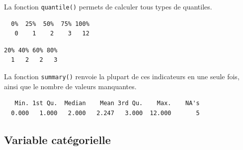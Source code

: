 \documentclass[
  letterpaper,
  DIV=11,
  numbers=noendperiod,
  oneside]{scrreprt}
\newenvironment{Shaded}{\begin{snugshade}}{\end{snugshade}}
\newcommand{\AttributeTok}[1]{\textcolor[rgb]{0.40,0.45,0.13}{#1}}
\newcommand{\ConstantTok}[1]{\textcolor[rgb]{0.56,0.35,0.01}{#1}}
\newcommand{\DecValTok}[1]{\textcolor[rgb]{0.68,0.00,0.00}{#1}}
\newcommand{\FunctionTok}[1]{\textcolor[rgb]{0.28,0.35,0.67}{#1}}
\newcommand{\NormalTok}[1]{\textcolor[rgb]{0.00,0.23,0.31}{#1}}
\newcommand{\SpecialCharTok}[1]{\textcolor[rgb]{0.37,0.37,0.37}{#1}}
\begin{document}
La fonction \texttt{quantile()} permets de calculer tous types de
quantiles.

\begin{Shaded}
\end{Shaded}

\begin{verbatim}
  0%  25%  50%  75% 100% 
   0    1    2    3   12 
\end{verbatim}

\begin{Shaded}
\end{Shaded}

\begin{verbatim}
20% 40% 60% 80% 
  1   2   2   3 
\end{verbatim}

La fonction \texttt{summary()} renvoie la plupart de ces indicateurs en
une seule fois, ainsi que le nombre de valeurs manquantes.

\begin{Shaded}
\end{Shaded}

\begin{verbatim}
   Min. 1st Qu.  Median    Mean 3rd Qu.    Max.    NA's 
  0.000   1.000   2.000   2.247   3.000  12.000       5 
\end{verbatim}

\hypertarget{sec-table-univariee}{%
\subsection{Variable catégorielle}\label{sec-table-univariee}}
\end{document}
